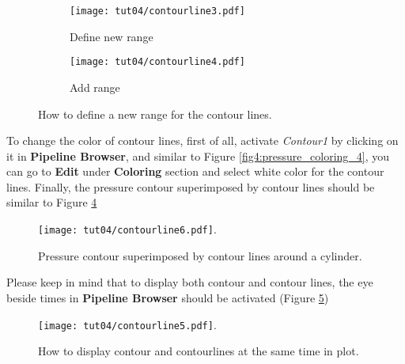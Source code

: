\begin{figure}[htbp]
    \centering
    \begin{subfigure}[b]{.4\textwidth}
        \centering
        \texttt{[image: tut04/contourline3.pdf]}
        \caption{Define new range}
        \label{fig4:contourby_4 a}
    \end{subfigure}
    \hfill
    \begin{subfigure}[b]{.4\textwidth}
        \centering
        \texttt{[image: tut04/contourline4.pdf]}
        \caption{Add range}
        \label{fig4:contourby_4 b}
    \end{subfigure}     
    \caption{How to define a new range for the contour lines.}
    \label{fig4:contourby_4}
\end{figure}

To change the color of contour lines, first of all, activate \textit{Contour1} by clicking on it in \textbf{Pipeline Browser}, and similar to Figure \ref{fig4:pressure_coloring_4}, you can go to \textbf{Edit} under \textbf{Coloring} section and select white color for the contour lines. Finally, the pressure contour superimposed by contour lines should be similar to Figure \ref{fig4:contourline6_4}
\begin{figure}[htbp]
    \centering
    \texttt{[image: tut04/contourline6.pdf]}.
    \caption{Pressure contour superimposed by contour lines around a cylinder.}
    \label{fig4:contourline6_4}
\end{figure}
Please keep in mind that to display both contour and contour lines, the eye beside times in \textbf{Pipeline Browser} should be activated (Figure \ref{fig4:contourline5_4})
\begin{figure}[htbp]
    \centering
    \texttt{[image: tut04/contourline5.pdf]}.
    \caption{How to display contour and contourlines at the same time in plot.}
    \label{fig4:contourline5_4}
\end{figure}

